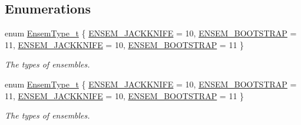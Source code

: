 \subsection*{Enumerations}
\begin{DoxyCompactItemize}
\item 
enum \mbox{\hyperlink{namespaceENSEM_a2dc2c4a26884f343471e52f23479ddbe}{Ensem\+Type\+\_\+t}} \{ \mbox{\hyperlink{namespaceENSEM_a2dc2c4a26884f343471e52f23479ddbea8aa9c7338ce9385f7614ac37c0977b0c}{E\+N\+S\+E\+M\+\_\+\+J\+A\+C\+K\+K\+N\+I\+FE}} = 10, 
\mbox{\hyperlink{namespaceENSEM_a2dc2c4a26884f343471e52f23479ddbea3c46f96ff58ab0b92731bd7ae20276ef}{E\+N\+S\+E\+M\+\_\+\+B\+O\+O\+T\+S\+T\+R\+AP}} = 11, 
\mbox{\hyperlink{namespaceENSEM_a2dc2c4a26884f343471e52f23479ddbea8aa9c7338ce9385f7614ac37c0977b0c}{E\+N\+S\+E\+M\+\_\+\+J\+A\+C\+K\+K\+N\+I\+FE}} = 10, 
\mbox{\hyperlink{namespaceENSEM_a2dc2c4a26884f343471e52f23479ddbea3c46f96ff58ab0b92731bd7ae20276ef}{E\+N\+S\+E\+M\+\_\+\+B\+O\+O\+T\+S\+T\+R\+AP}} = 11
 \}
\begin{DoxyCompactList}\small\item\em The types of ensembles. \end{DoxyCompactList}\item 
enum \mbox{\hyperlink{namespaceENSEM_a2dc2c4a26884f343471e52f23479ddbe}{Ensem\+Type\+\_\+t}} \{ \mbox{\hyperlink{namespaceENSEM_a2dc2c4a26884f343471e52f23479ddbea8aa9c7338ce9385f7614ac37c0977b0c}{E\+N\+S\+E\+M\+\_\+\+J\+A\+C\+K\+K\+N\+I\+FE}} = 10, 
\mbox{\hyperlink{namespaceENSEM_a2dc2c4a26884f343471e52f23479ddbea3c46f96ff58ab0b92731bd7ae20276ef}{E\+N\+S\+E\+M\+\_\+\+B\+O\+O\+T\+S\+T\+R\+AP}} = 11, 
\mbox{\hyperlink{namespaceENSEM_a2dc2c4a26884f343471e52f23479ddbea8aa9c7338ce9385f7614ac37c0977b0c}{E\+N\+S\+E\+M\+\_\+\+J\+A\+C\+K\+K\+N\+I\+FE}} = 10, 
\mbox{\hyperlink{namespaceENSEM_a2dc2c4a26884f343471e52f23479ddbea3c46f96ff58ab0b92731bd7ae20276ef}{E\+N\+S\+E\+M\+\_\+\+B\+O\+O\+T\+S\+T\+R\+AP}} = 11
 \}
\begin{DoxyCompactList}\small\item\em The types of ensembles. \end{DoxyCompactList}\end{DoxyCompactItemize}
